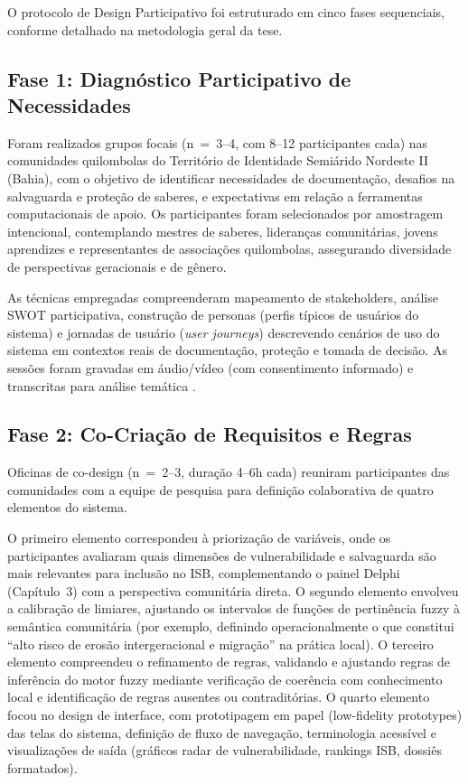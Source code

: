 O protocolo de Design Participativo foi estruturado em cinco fases sequenciais, conforme detalhado na metodologia geral da tese.


\subsection{Fase 1: Diagnóstico Participativo de Necessidades}

Foram realizados grupos focais (n~=~3--4, com 8--12 participantes cada) nas comunidades quilombolas do Território de Identidade Semiárido Nordeste II (Bahia), com o objetivo de identificar necessidades de documentação, desafios na salvaguarda e proteção de saberes, e expectativas em relação a ferramentas computacionais de apoio. Os participantes foram selecionados por amostragem intencional, contemplando mestres de saberes, lideranças comunitárias, jovens aprendizes e representantes de associações quilombolas, assegurando diversidade de perspectivas geracionais e de gênero.

As técnicas empregadas compreenderam mapeamento de stakeholders, análise SWOT participativa, construção de personas (perfis típicos de usuários do sistema) e jornadas de usuário (\textit{user journeys}) descrevendo cenários de uso do sistema em contextos reais de documentação, proteção e tomada de decisão. As sessões foram gravadas em áudio/vídeo (com consentimento informado) e transcritas para análise temática \cite{Braun2006}.


\subsection{Fase 2: Co-Criação de Requisitos e Regras}

Oficinas de co-design (n~=~2--3, duração 4--6h cada) reuniram participantes das comunidades com a equipe de pesquisa para definição colaborativa de quatro elementos do sistema.

O primeiro elemento correspondeu à priorização de variáveis, onde os participantes avaliaram quais dimensões de vulnerabilidade e salvaguarda são mais relevantes para inclusão no ISB, complementando o painel Delphi (Capítulo~3) com a perspectiva comunitária direta. O segundo elemento envolveu a calibração de limiares, ajustando os intervalos de funções de pertinência fuzzy à semântica comunitária (por exemplo, definindo operacionalmente o que constitui ``alto risco de erosão intergeracional e migração'' na prática local). O terceiro elemento compreendeu o refinamento de regras, validando e ajustando regras de inferência do motor fuzzy mediante verificação de coerência com conhecimento local e identificação de regras ausentes ou contraditórias. O quarto elemento focou no design de interface, com prototipagem em papel (low-fidelity prototypes) das telas do sistema, definição de fluxo de navegação, terminologia acessível e visualizações de saída (gráficos radar de vulnerabilidade, rankings ISB, dossiês formatados).

